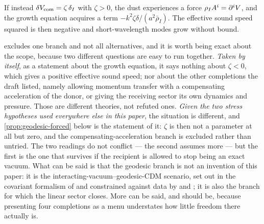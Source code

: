 \begin{proposition}
  \label{prop:clumping-unstable}
  If instead $\delta V_{\rm com}=\zeta\,\delta_I$ with $\zeta>0$, the dust
  experiences a force $\rho_{I} A^i=\partial^i V$, and the growth equation
  acquires a term $-k^2\zeta\delta/(a^2\bar\rho_I)$. The effective sound speed
  squared is then negative and short-wavelength modes grow without bound.
\end{proposition}

 excludes one branch and not all alternatives, and
it is worth being exact about the scope, because two different questions are
easy to run together. \emph{Taken by itself}, as a statement about the growth
equation, it says nothing about $\zeta<0$, which gives a positive effective
sound speed; nor about the other completions the draft listed, namely allowing
momentum transfer with a compensating acceleration of the donor, or giving the
receiving sector its own dynamics and pressure. Those are different theories,
not refuted ones. \emph{Given the two stress hypotheses used everywhere else in
this paper}, the situation is different, and \cref{prop:geodesic-forced} below
is the statement of it: $\zeta$ is then not a parameter at all but zero, and
the compensating-acceleration branch is excluded rather than untried. The two
readings do not conflict --- the second assumes more --- but the first is the
one that survives if the recipient is allowed to stop being an exact vacuum. What can be said is that the geodesic branch is not an invention of this
paper: it is the interacting-vacuum--geodesic-CDM scenario, set out in the
covariant formalism of
\textcite{wands2012_12036776,sebastianutti2023_231214123} and constrained
against data by \textcite{martinelli2019_190210694} and
\textcite{hogg2020_200210449}; it is also the branch for which the linear
sector closes. More can be said, and should be, because
presenting four completions as a menu understates how little freedom there
actually is.

